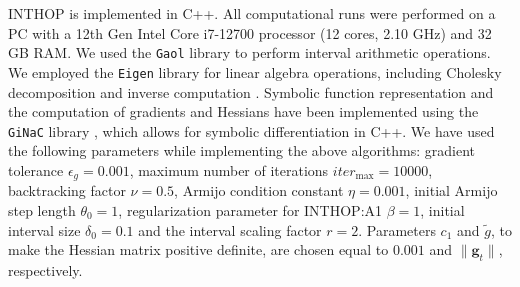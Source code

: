 \documentclass{elsarticle}
\numberwithin{equation}{section}
\begin{document}
INTHOP is implemented in C++. All computational runs were performed on a PC with a 12th Gen Intel Core i7-12700 processor (12 cores, 2.10 GHz) and 32 GB RAM. We used the \texttt{Gaol} library \cite{goualard2005gaol} to perform interval arithmetic operations. We employed the \texttt{Eigen} library for linear algebra operations, including Cholesky decomposition and inverse computation \cite{eigenweb}. Symbolic function representation and the computation of gradients and Hessians have been implemented using the \texttt{GiNaC} library \cite{bauer2002introduction}, which allows for symbolic differentiation in C++.
We have used the following parameters while implementing the above algorithms: gradient tolerance $\epsilon_g = 0.001$, maximum number of iterations $iter_{\max} = 10000$, backtracking factor $\nu = 0.5$, Armijo condition constant $\eta = 0.001$, initial Armijo step length $\theta_0 = 1$, regularization parameter for INTHOP:A1 $\beta = 1$, initial interval size $\delta_0 = 0.1$ and the interval scaling factor $r = 2$.  Parameters $c_1$ and $\tilde{g}$, to make the Hessian matrix positive definite, are chosen equal to  $0.001$ and $\lVert \textbf{g}_{t}\rVert$, respectively.
\end{document}
